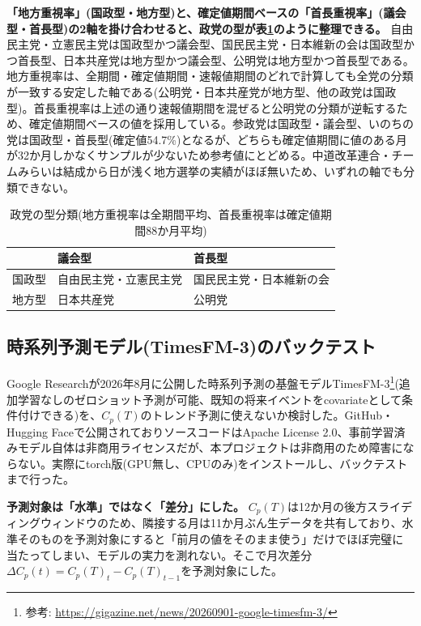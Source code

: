 \documentclass[a4paper,11pt]{ltjsarticle}
\begin{document}
\textbf{「地方重視率」(国政型・地方型)と、確定値期間ベースの「首長重視率」(議会型・首長型)の2軸を掛け合わせると、政党の型が表\ref{tab:party-matrix}のように整理できる。} 自由民主党・立憲民主党は国政型かつ議会型、国民民主党・日本維新の会は国政型かつ首長型、日本共産党は地方型かつ議会型、公明党は地方型かつ首長型である。地方重視率は、全期間・確定値期間・速報値期間のどれで計算しても全党の分類が一致する安定した軸である(公明党・日本共産党が地方型、他の政党は国政型)。首長重視率は上述の通り速報値期間を混ぜると公明党の分類が逆転するため、確定値期間ベースの値を採用している。参政党は国政型・議会型、いのちの党は国政型・首長型(確定値54.7\%)となるが、どちらも確定値期間に値のある月が32か月しかなくサンプルが少ないため参考値にとどめる。中道改革連合・チームみらいは結成から日が浅く地方選挙の実績がほぼ無いため、いずれの軸でも分類できない。

\begin{table}[h]
\centering
\small
\caption{政党の型分類(地方重視率は全期間平均、首長重視率は確定値期間88か月平均)}
\label{tab:party-matrix}
\begin{tabular}{lll}
\toprule
 & 議会型 & 首長型 \\
\midrule
国政型 & 自由民主党・立憲民主党 & 国民民主党・日本維新の会 \\
地方型 & 日本共産党 & 公明党 \\
\bottomrule
\end{tabular}
\end{table}

\subsection{時系列予測モデル(TimesFM-3)のバックテスト}
\label{sec:timesfm-backtest}

Google Researchが2026年8月に公開した時系列予測の基盤モデルTimesFM-3\footnote{参考: \url{https://gigazine.net/news/20260901-google-timesfm-3/}}(追加学習なしのゼロショット予測が可能、既知の将来イベントをcovariateとして条件付けできる)を、$C_p(T)$のトレンド予測に使えないか検討した。GitHub・Hugging Faceで公開されておりソースコードはApache License 2.0、事前学習済みモデル自体は非商用ライセンスだが、本プロジェクトは非商用のため障害にならない。実際にtorch版(GPU無し、CPUのみ)をインストールし、バックテストまで行った。

\textbf{予測対象は「水準」ではなく「差分」にした。} $C_p(T)$は12か月の後方スライディングウィンドウのため、隣接する月は11か月ぶん生データを共有しており、水準そのものを予測対象にすると「前月の値をそのまま使う」だけでほぼ完璧に当たってしまい、モデルの実力を測れない。そこで月次差分$\Delta C_p(t) = C_p(T)_t - C_p(T)_{t-1}$を予測対象にした。
\end{document}
